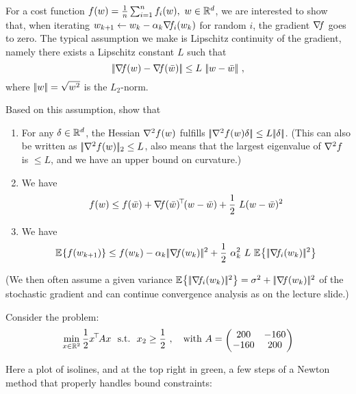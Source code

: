 

\renewcommand{\course}{Optimization Algorithms}
\renewcommand{\coursepicture}{optim}
\renewcommand{\coursedate}{Winter 2024/25}
\renewcommand{\exnum}{Weekly Exercises 8}

\exercises


\exercisestitle



For a cost function $f(w) = \frac{1}{n} \sum_{i=1}^n f_i(w),~ w\in{\mathbb{R}}^d$, we are interested to show that, when iterating $w_{k{{\hspace*{-.0pt}\text{\rm +}\hspace*{-.5pt}}1}} \gets w_k - \alpha_k {\nabla_{\!\!}} f_i(w_k)$ for random $i$, the gradient ${\nabla_{\!\!}} f$ goes to zero. The typical assumption we make is Lipschitz continuity of the gradient, namely there exists a Lipschitz constant $L$ such that
$$\norm{\na f(w) - \na f(\bar w)} \le L~ \norm{w - \bar w} ~,$$
where $|\!|w|\!| = \sqrt{w^2}$ is the $L_2$-norm.

Based on this assumption, show that
\begin{enumerate}
\item For any $\delta\in{\mathbb{R}}^d$, the Hessian ${\nabla_{\!\!}^2} f(w)$ fulfills $|\!|{\nabla_{\!\!}^2} f(w) \delta|\!| \le L |\!|\delta|\!|$. (This can also be written as $|\!|{\nabla_{\!\!}^2} f(w)|\!|_2 \le L$,  also means that the largest eigenvalue of ${\nabla_{\!\!}^2} f$ is $\le L$, and we have an upper bound on curvature.)
\item We have
$$f(w) \le f(\bar w) + {\nabla_{\!\!}} f(\bar w)^{\!\top\!} (w - \bar w) + \frac{1}{2}~ L (w-\bar w)^2$$
\item We have
$$\Exp{f(w_{k+1})}
\le f(w_k) - \a_k \norm{\na f(w_k)}^2 + \half~ \a_k^2~ L~ \Exp{\norm{\na f_i(w_k)}^2}$$
\end{enumerate}

(We then often assume a given variance $\Exp{\norm{\na f_i(w_k)}^2}=\s^2+\norm{\na f(w_k)}^2$ of the stochastic gradient and can continue convergence analysis as on the lecture slide.)




Consider the problem:
$$\min_{x\in\RRR^2} \half x^\T A x \st x_2 \ge \half\comma \text{with}~ A = \mat{cc}{200 & -160 \\ -160 & 200} $$

Here a plot of isolines, and at the top right in green, a few steps of a Newton method that properly handles bound constraints:

